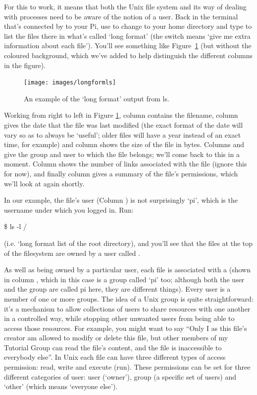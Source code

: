 For this to work, it means that both the Unix file system and its way
of dealing with processes need to be aware of the notion of a
user. Back in the terminal that's connected by  to your
Pi, use  to change to your home directory and type
 to list the files there in what's called `long
format' (the  switch means `give me extra information about
each file'). You'll see something like Figure~\ref{figure:longformls}
(but without the coloured background, which we've added to help
distinguish the different columns in the figure).

\begin{figure}
\centerline{\texttt{[image: images/longformls]}}
\caption{An example of the `long format' output from ls.}\label{figure:longformls}
\end{figure}

Working from right to left in Figure \ref{figure:longformls}, column
\protect{} contains the filename, column \protect{}
gives the date that the file was last modified (the exact format of
the date will vary so as to always be `useful'; older files will have
a year instead of an exact time, for example) and column
\protect{} shows the size of the file in bytes. Columns
\protect{} and \protect{} give the group and user to
which the file belongs; we'll come back to this in a moment. Column
\protect{} shows the number of links associated with the file
(ignore this for now), and finally column \protect{} gives a
summary of the file's permissions, which we'll look at again shortly.

In our example, the file's user (Column \protect{}) is not
surprisingly `pi', which is the username under which you logged
in. Run:

\begin{ttoutenv}
\$ ls -l /
\end{ttoutenv}

(i.e. `long format list of the root directory), and you'll see that
the files at the top of the filesystem are owned by a user called
.

As well as being owned by a particular user, each file is associated
with a  (shown in column \protect{}, which in
this case is a group called `pi' too; although both the user and the
group are called pi here, they are different things). Every user is a
member of one or more groups. The idea of a Unix group is quite
straightforward: it's a mechanism to allow collections of users to
share resources with one another in a controlled way, while stopping
other unwanted users from being able to access those resources. For
example, you might want to say ``Only I as this file's creator am
allowed to modify or delete this file, but other members of my
Tutorial Group can read the file's content, and the file is
inaccessible to everybody else''. In Unix each file can have three
different types of access permission: read, write and execute
(run). These permissions can be set for three different categories of
user: user (`owner'), group (a specific set of users) and `other'
(which means `everyone else').

